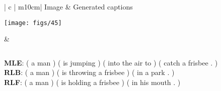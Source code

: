 \begin{table}[H]
  \centering
  \begin{tabular}{ | c | m{10cm}|  }
    \hline
    Image &  Generated captions \\ \hline




        \begin{minipage}{.24\textwidth}
      \vspace{2.5mm}
      \texttt{[image: figs/45]}
      \vspace{-2.mm}
    \end{minipage}
    &
   
               $\ $\begin{minipage}{0.95\linewidth}
      {\bf MLE}: ( a man ) ( is jumping ) ( into the air to ) ( catch a frisbee . )\\[2mm]
      {\bf  RLB}: ( a man ) ( is throwing a frisbee ) ( in a park . )\\[2mm]
      {\bf RLF}: ( a man ) ( is holding a frisbee ) ( in his mouth . )
      \end{minipage}
    \\ \hline


  \end{tabular}
  \caption{A failed example, where the baselines produce a more reasonable caption.}\label{tbl:rlfailed}
\end{table}